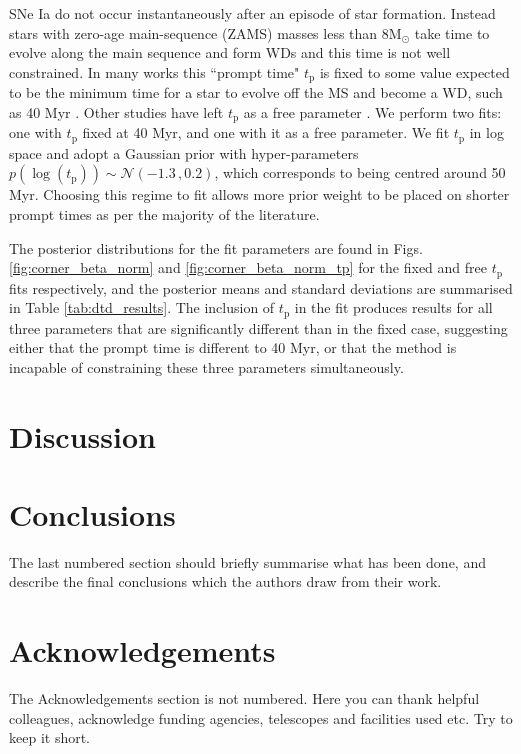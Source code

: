 \documentclass[fleqn,usenatbib]{mnras}
\begin{document}
SNe Ia do not occur instantaneously after an episode of star formation. Instead stars with zero-age main-sequence (ZAMS) masses less than $8 \mathrm{M}_{\odot}$ take time to evolve along the main sequence and form WDs and this time is not well constrained. In many works this ``prompt time" $t_{\mathrm{p}}$ is fixed to some value expected to be the minimum time for a star to evolve off the MS and become a WD, such as 40 Myr \citep{Maoz2012,Graur2014,Graur2018}. Other studies have left $t_{\mathrm{p}}$ as a free parameter \citep{Heringer2019,Asier2020}. We perform two fits: one with $t_{\mathrm{p}}$ fixed at 40 Myr, and one with it as a free parameter. We fit $t_{\mathrm{p}}$ in log space and adopt a Gaussian prior with hyper-parameters $p(\log(t_{\mathrm{p}})) \sim \mathcal{N}(-1.3\,,0.2)$, which corresponds to being centred around 50 Myr. Choosing this regime to fit allows more prior weight to be placed on shorter prompt times as per the majority of the literature. 

The posterior distributions for the fit parameters are found in Figs. \ref{fig:corner_beta_norm} and \ref{fig:corner_beta_norm_tp} for the fixed and free $t_{\mathrm{p}}$ fits respectively, and the posterior means and standard deviations are summarised in Table \ref{tab:dtd_results}. The inclusion of $t_{\mathrm{p}}$ in the fit produces results for all three parameters that are significantly different than in the fixed case, suggesting either that the prompt time is different to 40 Myr, or that the method is incapable of constraining these three parameters simultaneously.

\section{Discussion}
\label{sec:discussion}

\section{Conclusions}
\label{sec:conclusion}
The last numbered section should briefly summarise what has been done, and describe
the final conclusions which the authors draw from their work.

\section*{Acknowledgements}

The Acknowledgements section is not numbered. Here you can thank helpful
colleagues, acknowledge funding agencies, telescopes and facilities used etc.
Try to keep it short.
\end{document}
